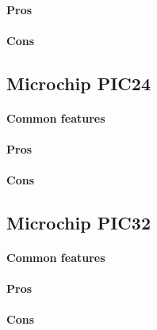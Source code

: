 \documentclass[a4paper,10pt]{article}
\begin{document}
\begin{multicols}{2}
\paragraph{Pros}
\TODO


\paragraph{Cons}
\TODO


\subsection{Microchip PIC24}

\TODO


\paragraph{Common features}
\TODO


\paragraph{Pros}
\TODO


\paragraph{Cons}
\TODO


\subsection{Microchip PIC32}

\TODO


\paragraph{Common features}
\TODO


\paragraph{Pros}
\TODO


\paragraph{Cons}
\TODO



\end{multicols}
\end{document}
